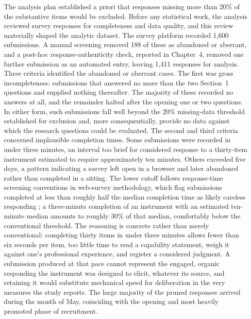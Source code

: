 The analysis plan established a priori that responses missing more than 20\% of the substantive items would be excluded. Before any statistical work, the analysis reviewed survey responses for completeness and data quality, and this review materially shaped the analytic dataset. The survey platform recorded 1{,}600 submissions. A manual screening removed 188 of these as abandoned or aberrant, and a post-hoc response-authenticity check, reported in Chapter~4, removed one further submission as an automated entry, leaving 1{,}411 responses for analysis. Three criteria identified the abandoned or aberrant cases. The first was gross incompleteness: submissions that answered no more than the two Section~1 questions and supplied nothing thereafter. The majority of these recorded no answers at all, and the remainder halted after the opening one or two questions. In either form, such submissions fall well beyond the 20\% missing-data threshold established for exclusion and, more consequentially, provide no data against which the research questions could be evaluated. The second and third criteria concerned implausible completion times. Some submissions were recorded in under three minutes, an interval too brief for considered response to a thirty-item instrument estimated to require approximately ten minutes. Others exceeded five days, a pattern indicating a survey left open in a browser and later abandoned rather than completed in a sitting. The lower cutoff follows response-time screening conventions in web-survey methodology, which flag submissions completed at less than roughly half the median completion time as likely careless responding \parencite{Greszki_Speeding_2015, Leiner_TooFast_2019}; a three-minute completion of an instrument with an estimated ten-minute median amounts to roughly 30\% of that median, comfortably below the conventional threshold. The reasoning is concrete rather than merely conventional: completing thirty items in under three minutes allows fewer than six seconds per item, too little time to read a capability statement, weigh it against one's professional experience, and register a considered judgment. A submission produced at that pace cannot represent the engaged, organic responding the instrument was designed to elicit, whatever its source, and retaining it would substitute mechanical speed for deliberation in the very measures the study reports. The large majority of the pruned responses arrived during the month of May, coinciding with the opening and most heavily promoted phase of recruitment. %

